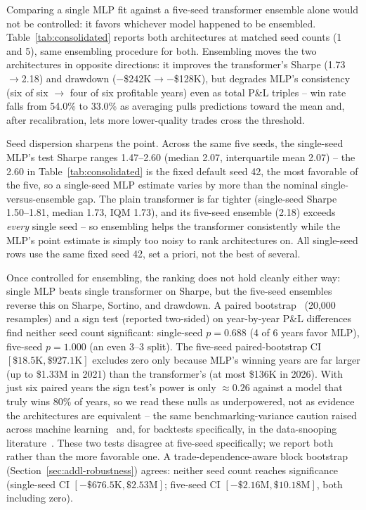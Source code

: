 \documentclass[sigconf,review,anonymous]{acmart}
\begin{document}
Comparing a single MLP fit against a five-seed transformer ensemble alone would not be controlled: it favors whichever model happened to be ensembled. Table~\ref{tab:consolidated} reports both architectures at matched seed counts (1 and 5), same ensembling procedure for both. Ensembling moves the two architectures in opposite directions: it improves the transformer's Sharpe (1.73$\to$2.18) and drawdown ($-$\$242K$\to-$\$128K), but degrades MLP's consistency (six of six $\to$ four of six profitable years) even as total P\&L triples -- win rate falls from 54.0\% to 33.0\% as averaging pulls predictions toward the mean and, after recalibration, lets more lower-quality trades cross the threshold.

Seed dispersion sharpens the point. Across the same five seeds, the single-seed MLP's test Sharpe ranges 1.47--2.60 (median 2.07, interquartile mean 2.07) -- the 2.60 in Table~\ref{tab:consolidated} is the fixed default seed 42, the most favorable of the five, so a single-seed MLP estimate varies by more than the nominal single-versus-ensemble gap. The plain transformer is far tighter (single-seed Sharpe 1.50--1.81, median 1.73, IQM 1.73), and its five-seed ensemble (2.18) exceeds \emph{every} single seed -- so ensembling helps the transformer consistently while the MLP's point estimate is simply too noisy to rank architectures on. All single-seed rows use the same fixed seed 42, set a priori, not the best of several.

Once controlled for ensembling, the ranking does not hold cleanly either way: single MLP beats single transformer on Sharpe, but the five-seed ensembles reverse this on Sharpe, Sortino, and drawdown. A paired bootstrap~\cite{efron1993bootstrap} (20{,}000 resamples) and a sign test (reported two-sided) on year-by-year P\&L differences find neither seed count significant: single-seed $p=0.688$ (4 of 6 years favor MLP), five-seed $p=1.000$ (an even 3--3 split). The five-seed paired-bootstrap CI $[\$18.5\text{K}, \$927.1\text{K}]$ excludes zero only because MLP's winning years are far larger (up to \$1.33M in 2021) than the transformer's (at most \$136K in 2026). With just six paired years the sign test's power is only $\approx0.26$ against a model that truly wins 80\% of years, so we read these nulls as underpowered, not as evidence the architectures are equivalent -- the same benchmarking-variance caution raised across machine learning~\cite{bouthillier2021accounting,dodge2019show,agarwal2021deep,melis2018state,lucic2018gans} and, for backtests specifically, in the data-snooping literature~\cite{white2000reality,hansen2005spa,harvey2016crosssection}. These two tests disagree at five-seed specifically; we report both rather than the more favorable one. A trade-dependence-aware block bootstrap~\cite{kunsch1989} (Section~\ref{sec:addl-robustness}) agrees: neither seed count reaches significance (single-seed CI $[-\$676.5\text{K}, \$2.53\text{M}]$; five-seed CI $[-\$2.16\text{M}, \$10.18\text{M}]$, both including zero).
\end{document}
